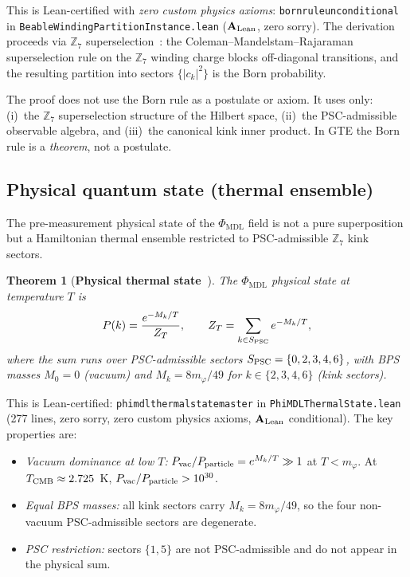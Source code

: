 \documentclass[11pt]{article}
\newtheorem{theorem}{Theorem}[section]
\theoremstyle{remark}
\newcommand{\PHIMDL}{\Phi_{\mathrm{MDL}}}
\newcommand{\ZS}{\mathbb{Z}_7}
\newcommand{\lean}[1]{%
  \penalty-100
  \begingroup\def\_{\textunderscore\allowbreak}\texttt{#1}\endgroup}
\newcommand{\CatAL}{\ensuremath{\textbf{A}_{\rm Lean}}}
\begin{document}
\noindent
This is Lean-certified with \emph{zero custom physics axioms}:
\lean{born\_rule\_unconditional} in \lean{BeableWindingPartitionInstance.lean}
($\CatAL$, zero sorry).
The derivation proceeds via $\ZS$ superselection~\cite{SpivackCMCA}:
the Coleman--Mandelstam--Rajaraman superselection rule on the $\ZS$ winding
charge blocks off-diagonal transitions, and the resulting partition into
sectors $\{|c_k|^2\}$ is the Born probability.

The proof does not use the Born rule as a postulate or axiom.  It uses
only: (i)~the $\ZS$ superselection structure of the Hilbert space,
(ii)~the PSC-admissible observable algebra, and (iii)~the canonical kink
inner product.  In GTE the Born rule is a \emph{theorem}, not a postulate.

\subsection{Physical quantum state (thermal ensemble)}

The pre-measurement physical state of the $\PHIMDL$ field is not a pure
superposition but a Hamiltonian thermal ensemble restricted to
PSC-admissible $\ZS$ kink sectors.

\begin{theorem}[\textbf{Physical thermal state~\cite{SpivackPhiMDLField}}]
\label{thm:thermal}
The $\PHIMDL$ physical state at temperature $T$ is
\[
  P(k) = \frac{e^{-M_k/T}}{Z_T}, \qquad Z_T = \sum_{k\in S_{\rm PSC}} e^{-M_k/T},
\]
where the sum runs over PSC-admissible sectors $S_{\rm PSC} = \{0,2,3,4,6\}$,
with BPS masses $M_0 = 0$ (vacuum) and $M_k = 8m_\varphi/49$ for $k\in
\{2,3,4,6\}$ (kink sectors).
\end{theorem}

\noindent
This is Lean-certified: \lean{phimdl\_thermal\_state\_master} in
\lean{PhiMDLThermalState.lean} (277 lines, zero sorry, zero custom physics
axioms, $\CatAL$ conditional).  The key properties are:
\begin{itemize}[noitemsep]
\item \textit{Vacuum dominance at low $T$:}
  $P_{\rm vac}/P_{\rm particle} = e^{M_k/T} \gg 1$ at $T < m_\varphi$.
  At $T_{\rm CMB} \approx 2.725$~K, $P_{\rm vac}/P_{\rm particle} > 10^{30}$.
\item \textit{Equal BPS masses:} all kink sectors carry $M_k = 8m_\varphi/49$,
  so the four non-vacuum PSC-admissible sectors are degenerate.
\item \textit{PSC restriction:} sectors $\{1,5\}$ are not PSC-admissible and
  do not appear in the physical sum.
\end{itemize}
\end{document}
